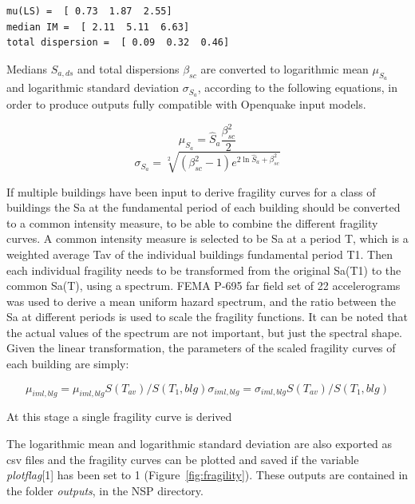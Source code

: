 \begin{Verbatim}[frame=single, commandchars=\\\{\}, samepage=true]
mu(LS) =  [ 0.73  1.87  2.55]
median IM =  [ 2.11  5.11  6.63]
total dispersion =  [ 0.09  0.32  0.46]
\end{Verbatim}

Medians $\hat{S}_{a,ds}$ and total dispersions $\beta_{sc}$ are converted to logarithmic mean $\mu_{S_a}$ and logarithmic standard deviation $\sigma_{S_a}$, according to the following equations, in order to produce outputs fully compatible with Openquake input models.

\begin{equation}
\mu_{S_a} = \hat{S}_a \frac{\beta_{sc}^2}{2}
\end{equation}
\begin{equation}
\sigma_{S_a} = \sqrt[2]{(\beta_{sc}^2-1) e^{2\ln{ \hat{S}_a}+\beta_{sc}^2}}
\end{equation}

If multiple buildings have been input to derive fragility curves for a class of buildings the Sa at the fundamental period of each building should be converted to a common intensity measure, to be able to combine the different fragility curves. A common intensity measure is selected to be Sa at a period T, which is a weighted average Tav of the individual buildings fundamental period T1. Then each individual fragility needs to be transformed from the original Sa(T1) to the common Sa(T), using a spectrum. FEMA P-695 far field set of 22 accelerograms was used to derive a mean uniform hazard spectrum, and the ratio between the Sa at different periods is used to scale the fragility functions. It can be noted that the actual values of the spectrum are not important, but just the spectral shape. Given the linear transformation, the parameters of the scaled fragility curves of each building are simply:

\begin{equation}
\mu_{iml, blg} = \mu_{iml, blg} S(T_{av})/ S(T_1, blg)
\sigma_{iml, blg} = \sigma_{iml, blg} S(T_{av})/ S(T_1, blg)
\end{equation}

At this stage a single fragility curve is derived 

The logarithmic mean and logarithmic standard deviation are also exported as csv files and the fragility curves can be plotted and saved if the variable \textit{plotflag}[1] has been set to 1 (Figure~\ref{fig:fragility}). These outputs are contained in the folder \textit{outputs}, in the NSP directory.

